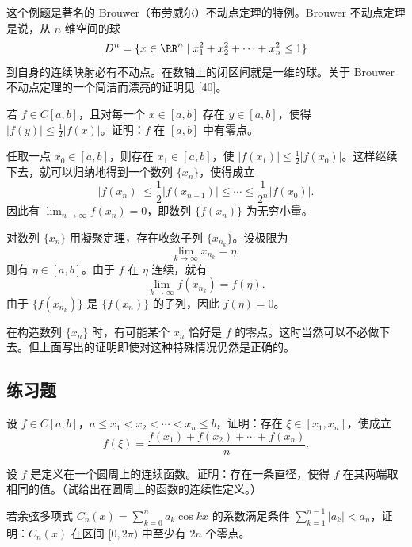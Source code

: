 \begin{xremark}
这个例题是著名的 Brouwer（布劳威尔）不动点定理的特例。Brouwer 不动点定理是说，从 $n$ 维空间的球
\[
  D^n=\{x\in\RR^n\mid x_1^2+x_2^2+\cdots+x_n^2\le1\}
\]
到自身的连续映射必有不动点。在数轴上的闭区间就是一维的球。关于 Brouwer 不动点定理的一个简洁而漂亮的证明见 [40]。
\end{xremark}

\begin{xexample}[5.2.5]
若 $f\in C[a,b]$，且对每一个 $x\in[a,b]$ 存在 $y\in[a,b]$，使得 $|f(y)|\le\frac12|f(x)|$。证明：$f$ 在 $[a,b]$ 中有零点。
\end{xexample}
\begin{xproof}
任取一点 $x_0\in[a,b]$，则存在 $x_1\in[a,b]$，使 $|f(x_1)|\le\frac12|f(x_0)|$。这样继续下去，就可以归纳地得到一个数列 $\{x_n\}$，使得成立
\[
  |f(x_n)|\le\frac12|f(x_{n-1})|\le\cdots\le\frac1{2^n}|f(x_0)|.
\]
因此有 $\lim_{n\to\infty}f(x_n)=0$，即数列 $\{f(x_n)\}$ 为无穷小量。

对数列 $\{x_n\}$ 用凝聚定理，存在收敛子列 $\{x_{n_k}\}$。设极限为
\[
  \lim_{k\to\infty}x_{n_k}=\eta,
\]
则有 $\eta\in[a,b]$。由于 $f$ 在 $\eta$ 连续，就有
\[
  \lim_{k\to\infty}f(x_{n_k})=f(\eta).
\]
由于 $\{f(x_{n_k})\}$ 是 $\{f(x_n)\}$ 的子列，因此 $f(\eta)=0$。
\end{xproof}

\begin{xremark}
在构造数列 $\{x_n\}$ 时，有可能某个 $x_n$ 恰好是 $f$ 的零点。这时当然可以不必做下去。但上面写出的证明即使对这种特殊情况仍然是正确的。
\end{xremark}

\subsection{练习题}

\begin{xexercise}[1]
设 $f\in C[a,b]$，$a\le x_1<x_2<\cdots<x_n\le b$，证明：存在 $\xi\in[x_1,x_n]$，使成立
  \[
    f(\xi)=\frac{f(x_1)+f(x_2)+\cdots+f(x_n)}{n}.
  \]
\end{xexercise}

\begin{xexercise}[2]
设 $f$ 是定义在一个圆周上的连续函数。证明：存在一条直径，使得 $f$ 在其两端取相同的值。（试给出在圆周上的函数的连续性定义。）
\end{xexercise}

\begin{xexercise}[3]
若余弦多项式 $C_n(x)=\sum_{k=0}^n a_k\cos kx$ 的系数满足条件 $\sum_{k=1}^{n-1}|a_k|<a_n$，证明：$C_n(x)$ 在区间 $[0,2\pi)$ 中至少有 $2n$ 个零点。
\end{xexercise}

